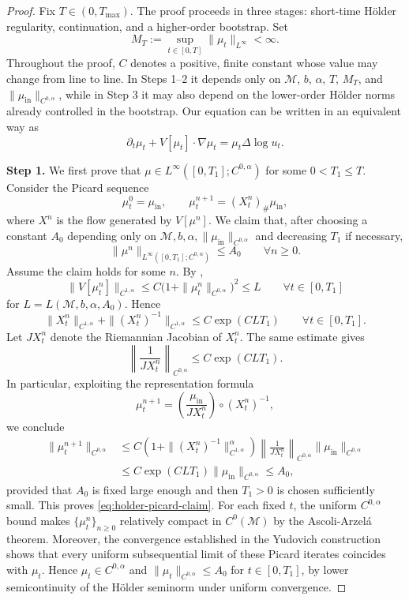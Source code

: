 \documentclass[11pt]{article}
\theoremstyle{definition}
\def\M{\mathcal M}
\begin{document}
\begin{proof}
Fix \(T\in(0,T_{\max})\).  The proof proceeds in three stages: short-time Hölder regularity,
continuation, and a higher-order bootstrap.  
Set
\[
M_T:=\sup_{t\in[0,T]}\|\mu_t\|_{L^\infty}<\infty .
\]
Throughout the proof, \(C\) denotes a positive, finite constant whose value may
change from line to line.  In Steps 1--2 it depends only on
 \(\M\), \(b\), \(\alpha\), \(T\), \(M_T\), and
\(\|\mu_{\mathrm{in}}\|_{C^{0,\alpha}}\), while in Step 3 it may also depend on the
lower-order Hölder norms already controlled in the bootstrap.
Our equation can be written in an equivalent way as
\[
\partial_t\mu_t+V[\mu_t]\cdot\nabla\mu_t=\mu_t\Delta\log u_t.
\]

\smallskip
\noindent\textbf{Step 1.}
We first prove that \(\mu\in L^\infty([0,T_1];C^{0,\alpha})\) for some
\(0<T_1\le T\).  Consider the Picard sequence
\[
\mu^0_t=\mu_{\mathrm{in}},\qquad
\mu^{n+1}_t=(X^n_t)_\#\mu_{\mathrm{in}},
\]
where \(X^n\) is the flow generated by \(V[\mu^n]\).  We claim that, after
choosing a constant \(A_0\) depending only on
\( \M,b,\alpha,\|\mu_{\mathrm{in}}\|_{C^{0,\alpha}}\) and decreasing \(T_1\) if necessary,
\begin{equation}\label{eq:holder-picard-claim}
\|\mu^n\|_{L^\infty([0,T_1];C^{0,\alpha})}
\le A_0
\qquad\forall n\ge0 .
\end{equation}
Assume the claim holds for some \(n\).  By
,
\[
\|V[\mu^n_t]\|_{C^{1,\alpha}}
\le
C\bigl(1+\|\mu^n_t\|_{C^{0,\alpha}}\bigr)^2
\le L
\qquad\forall t\in[0,T_1]
\]
for \(L=L( \M,b,\alpha,A_0)\).  Hence
\[
\|X^n_t\|_{C^{1,\alpha}}+\|(X^n_t)^{-1}\|_{C^{1,\alpha}}
\le C\exp(CLT_1)
\qquad\forall t\in[0,T_1].
\]
 Let \(JX_t^n\) denote the Riemannian Jacobian of \(X_t^n\).
The same estimate gives
\[
\left\|\frac1{ JX_t^n}\right\|_{C^{0,\alpha}}
\le C\exp(CLT_1).
\]
In particular, exploiting the representation formula
\[
\mu^{n+1}_t
=
\left(\frac{\mu_{\mathrm{in}}}{ JX_t^n}\right)\circ (X_t^n)^{-1},
\]
we conclude
\[
\begin{aligned}
\|\mu^{n+1}_t\|_{C^{0,\alpha}}
&\le
C\left(1+\|(X_t^n)^{-1}\|_{C^{1,\alpha}}^\alpha\right)
\left\|\frac1{ JX_t^n}\right\|_{C^{0,\alpha}}
\|\mu_{\mathrm{in}}\|_{C^{0,\alpha}}  \\
&\le
C\exp(CLT_1)\|\mu_{\mathrm{in}}\|_{C^{0,\alpha}}
\le A_0,
\end{aligned}
\]
provided that \(A_0\) is fixed large enough and then \(T_1>0\) is chosen
sufficiently small.  This proves
\eqref{eq:holder-picard-claim}.  
For each fixed \(t\), the uniform \(C^{0,\alpha}\) bound makes
\(\{\mu_t^n\}_{n\ge0}\) relatively compact in \(C^0(\M)\) by the
Ascoli-Arzel\'a theorem. Moreover, the convergence established in the
Yudovich construction shows that every uniform subsequential limit of these
Picard iterates coincides with \(\mu_t\).
Hence
\(\mu_t\in C^{0,\alpha}\) and
\(\|\mu_t\|_{C^{0,\alpha}}\le A_0\) for \(t\in[0,T_1]\), by lower
semicontinuity of the Hölder seminorm under uniform convergence.


\end{proof}
\end{document}
